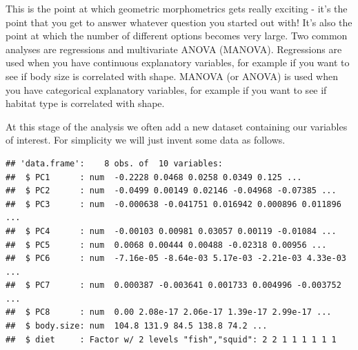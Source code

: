 \documentclass[]{book}
\newenvironment{Shaded}{\begin{snugshade}}{\end{snugshade}}
\newcommand{\KeywordTok}[1]{\textcolor[rgb]{0.13,0.29,0.53}{\textbf{{#1}}}}
\newcommand{\DataTypeTok}[1]{\textcolor[rgb]{0.13,0.29,0.53}{{#1}}}
\newcommand{\DecValTok}[1]{\textcolor[rgb]{0.00,0.00,0.81}{{#1}}}
\newcommand{\StringTok}[1]{\textcolor[rgb]{0.31,0.60,0.02}{{#1}}}
\newcommand{\CommentTok}[1]{\textcolor[rgb]{0.56,0.35,0.01}{\textit{{#1}}}}
\newcommand{\NormalTok}[1]{{#1}}
\begin{document}
This is the point at which geometric morphometrics gets really exciting
- it's the point that you get to answer whatever question you started
out with! It's also the point at which the number of different options
becomes very large. Two common analyses are regressions and multivariate
ANOVA (MANOVA). Regressions are used when you have continuous
explanatory variables, for example if you want to see if body size is
correlated with shape. MANOVA (or ANOVA) is used when you have
categorical explanatory variables, for example if you want to see if
habitat type is correlated with shape.

At this stage of the analysis we often add a new dataset containing our
variables of interest. For simplicity we will just invent some data as
follows.

\begin{Shaded}
\end{Shaded}

\begin{verbatim}
## 'data.frame':    8 obs. of  10 variables:
##  $ PC1      : num  -0.2228 0.0468 0.0258 0.0349 0.125 ...
##  $ PC2      : num  -0.0499 0.00149 0.02146 -0.04968 -0.07385 ...
##  $ PC3      : num  -0.000638 -0.041751 0.016942 0.000896 0.011896 ...
##  $ PC4      : num  -0.00103 0.00981 0.03057 0.00119 -0.01084 ...
##  $ PC5      : num  0.0068 0.00444 0.00488 -0.02318 0.00956 ...
##  $ PC6      : num  -7.16e-05 -8.64e-03 5.17e-03 -2.21e-03 4.33e-03 ...
##  $ PC7      : num  0.000387 -0.003641 0.001733 0.004996 -0.003752 ...
##  $ PC8      : num  0.00 2.08e-17 2.06e-17 1.39e-17 2.99e-17 ...
##  $ body.size: num  104.8 131.9 84.5 138.8 74.2 ...
##  $ diet     : Factor w/ 2 levels "fish","squid": 2 2 1 1 1 1 1 1
\end{verbatim}
\end{document}

